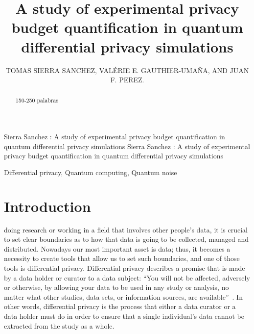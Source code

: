\documentclass{ieeeaccess}
\begin{document}

\title{A study of experimental privacy budget quantification in quantum differential privacy simulations}
\author{\uppercase{Tomas Sierra Sanchez},
\uppercase{Valérie E. Gauthier-Umaña, and Juan F. Perez}.}
\address[1]{Department of Systems and Computing Engineering, Universidad de los Andes  (email: t.sierras@uniandes.edu.co)}
\address[2]{Advisor, Department of Systems and Computing Engineering, Universidad de los Andes, Bogotá D.C, Colombia}
\address[3]{Advisor, Department of Industrial Engineering, Universidad de los Andes, Bogotá D.C, Colombia (email: jf.perez33@uniandes.edu.co)}

\markboth
{Sierra Sanchez \headeretal: A study of experimental privacy budget quantification in quantum differential privacy simulations}
{Sierra Sanchez \headeretal: A study of experimental privacy budget quantification in quantum differential privacy simulations}

\begin{abstract}
150-250 palabras
\end{abstract}

\begin{keywords}
Differential privacy, Quantum computing, Quantum noise  
\end{keywords}

\titlepgskip=-15pt

\maketitle

\section{Introduction}
\label{sec:introduction}
 doing research or working in a field that involves other people's data, it is crucial to set clear boundaries as to how that data is going to be collected, managed and distributed. Nowadays our most important asset is data; thus, it becomes a necessity to create tools that allow us to set such boundaries, and one of those tools is differential privacy. Differential privacy describes a promise that is made by a data holder or curator to a data subject: ``You will not be affected, adversely or otherwise, by allowing your data to be used in any study or analysis, no matter what other studies, data sets, or information sources, are available''~\cite{dwork2014algorithmic}. In other words, differential privacy is the process that either a data curator or a data holder must do in order to ensure that a single individual's data cannot be extracted from the study as a whole.
\end{document}
